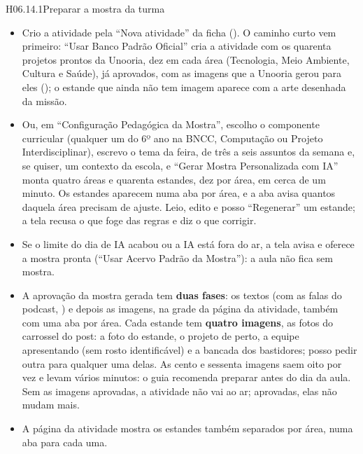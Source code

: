 \begin{historia}{H06.14.1}{Preparar a mostra da turma}{\parcial}
\aceite
\begin{itemize}
  \item Crio a atividade pela \enquote{Nova atividade} da ficha ().
    O caminho curto vem primeiro: \enquote{Usar Banco Padrão Oficial} cria a
    atividade com os quarenta projetos prontos da Unooria, dez em cada área
    (Tecnologia, Meio Ambiente, Cultura e Saúde), já aprovados, com as imagens
    que a Unooria gerou para eles (); o estande que ainda não tem
    imagem aparece com a arte desenhada da missão.
  \item Ou, em \enquote{Configuração Pedagógica da Mostra}, escolho o
    componente curricular (qualquer um do 6º ano na BNCC, Computação ou Projeto
    Interdisciplinar), escrevo o tema da feira, de três a seis assuntos da
    semana e, se quiser, um contexto da escola, e \enquote{Gerar Mostra
    Personalizada com IA} monta quatro áreas e quarenta estandes, dez por
    área, em cerca de um minuto. Os estandes aparecem numa aba por área, e a
    aba avisa quantos daquela área precisam de ajuste. Leio, edito e posso
    \enquote{Regenerar} um estande; a tela recusa o que foge das regras e diz o
    que corrigir.
  \item Se o limite do dia de IA acabou ou a IA está fora do ar, a tela avisa
    e oferece a mostra pronta (\enquote{Usar Acervo Padrão da Mostra}): a aula
    não fica sem mostra.
  \item A aprovação da mostra gerada tem \textbf{duas fases}: os textos (com
    as falas do podcast, ) e depois as imagens, na grade da
    página da atividade, também com uma aba por área. Cada estande tem
    \textbf{quatro imagens}, as fotos do carrossel do post: a foto do
    estande, o projeto de perto, a equipe apresentando (sem rosto
    identificável) e a bancada dos bastidores; posso pedir outra para
    qualquer uma delas. As cento e sessenta imagens saem oito por vez e
    levam vários minutos: o guia recomenda preparar antes do dia da aula. Sem as imagens aprovadas, a atividade não vai ao ar;
    aprovadas, elas não mudam mais.
  \item A página da atividade mostra os estandes também separados por área,
    numa aba para cada uma.
\end{itemize}
\end{historia}

